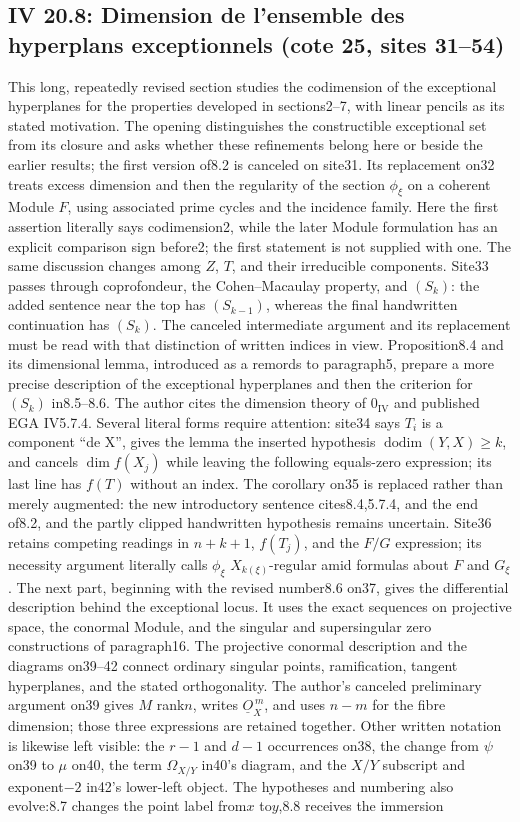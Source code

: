 \subsection*{IV 20.8: Dimension de l'ensemble des hyperplans exceptionnels (cote 25, sites 31--54)}
This long, repeatedly revised section studies the codimension of the exceptional hyperplanes for the properties developed in sections2--7, with linear pencils as its stated motivation. The opening distinguishes the constructible exceptional set from its closure and asks whether these refinements belong here or beside the earlier results; the first version of8.2 is canceled on site31. Its replacement on32 treats excess dimension and then the regularity of the section $\phi_\xi$ on a coherent Module $F$, using associated prime cycles and the incidence family. Here the first assertion literally says codimension2, while the later Module formulation has an explicit comparison sign before2; the first statement is not supplied with one. The same discussion changes among $Z$, $T$, and their irreducible components. Site33 passes through coprofondeur, the Cohen--Macaulay property, and $(S_k)$: the added sentence near the top has $(S_{k-1})$, whereas the final handwritten continuation has $(S_k)$. The canceled intermediate argument and its replacement must be read with that distinction of written indices in view. Proposition8.4 and its dimensional lemma, introduced as a remords to paragraph5, prepare a more precise description of the exceptional hyperplanes and then the criterion for $(S_k)$ in8.5--8.6. The author cites the dimension theory of $0_{\mathrm{IV}}$ and published EGA IV5.7.4. Several literal forms require attention: site34 says $T_i$ is a component ``de X'', gives the lemma the inserted hypothesis $\operatorname{dodim}(Y,X)\geq k$, and cancels $\dim f(X_j)$ while leaving the following equals-zero expression; its last line has $f(T)$ without an index. The corollary on35 is replaced rather than merely augmented: the new introductory sentence cites8.4,5.7.4, and the end of8.2, and the partly clipped handwritten hypothesis remains uncertain. Site36 retains competing readings in $n+k+1$, $f(T_j)$, and the $F/G$ expression; its necessity argument literally calls $\phi_\xi$ $X_{k(\xi)}$-regular amid formulas about $F$ and $G_\xi$. The next part, beginning with the revised number8.6 on37, gives the differential description behind the exceptional locus. It uses the exact sequences on projective space, the conormal Module, and the singular and supersingular zero constructions of paragraph16. The projective conormal description and the diagrams on39--42 connect ordinary singular points, ramification, tangent hyperplanes, and the stated orthogonality. The author's canceled preliminary argument on39 gives $M$ rank$n$, writes $\underline{O}_X^{\,m}$, and uses $n-m$ for the fibre dimension; those three expressions are retained together. Other written notation is likewise left visible: the $r-1$ and $d-1$ occurrences on38, the change from $\psi$ on39 to $\mu$ on40, the term $\Omega_{X/Y}$ in40's diagram, and the $X/Y$ subscript and exponent$-2$ in42's lower-left object. The hypotheses and numbering also evolve:8.7 changes the point label from$x$ to$y$,8.8 receives the immersion 